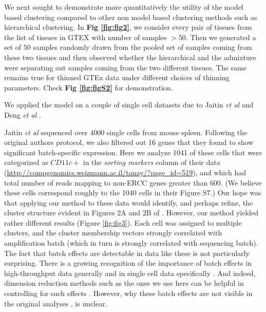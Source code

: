 We next sought to demonstrate more quantitatively the utility of the model based clustering compared to other non model based clustering methods such as hierarchical clustering. In \textbf{Fig \ref{fig:fig2}}, we consider every pair of tissues from the list of tissues in GTEX with number of samples $> 50$. Then we generated a set of $50$ samples randomly drawn from the pooled set of samples coming from these two tissues and then observed whether the hierarchical and the admixture were separating out samples coming from the two different tissues. The same remains true for  thinned GTEx data under different choices of thinning parameters. Check  \textbf{Fig \ref{fig:figS2}} for demonstration.  

We applied the model on a couple of single cell datasets due to Jaitin \textit{et al} \cite{Jaitin2014} and Deng \textit{et al} \cite{Deng2014}.  

Jaitin \textit{et al} sequenced over $4000$ single cells from mouse spleen. Following the original authors protocol, we also filtered out 16 genes that they found to show significant batch-specific expression. Here we analyze 1041 of these cells that were categorized as $CD11c+$ in the \textit{sorting markers} column of their data (\url{http://compgenomics.weizmann.ac.il/tanay/?page_id=519}), and which had total number of reads mapping to non-ERCC genes greater than $600$. (We believe these cells correspond roughly to the 1040 cells in their Figure S7.)   Our hope was that applying our method to these data would identify, and perhaps refine, the cluster structure evident in Figures 2A and 2B of \cite{Jaitin2014}. However, our method yielded rather different results (Figure \ref{fig:fig3}). Each cell was assigned to multiple clusters, and the cluster membership vectors strongly correlated with amplification batch (which in turn is strongly correlated with sequencing batch). The fact that batch effects are detectable in data like these is not particularly surprising. There is a growing recognition of the importance of batch effects in high-throughput data generally \cite{Leek2010} and in single cell data specifically \cite{Hicks2015}. And indeed, dimension reduction methods such as the ones we use here can be helpful in controlling for such effects \cite{Leek2007} \cite{Stegle2012}. However, why these batch effects are not visible in the original analyses \cite{Jaitin2014}, is unclear. 



